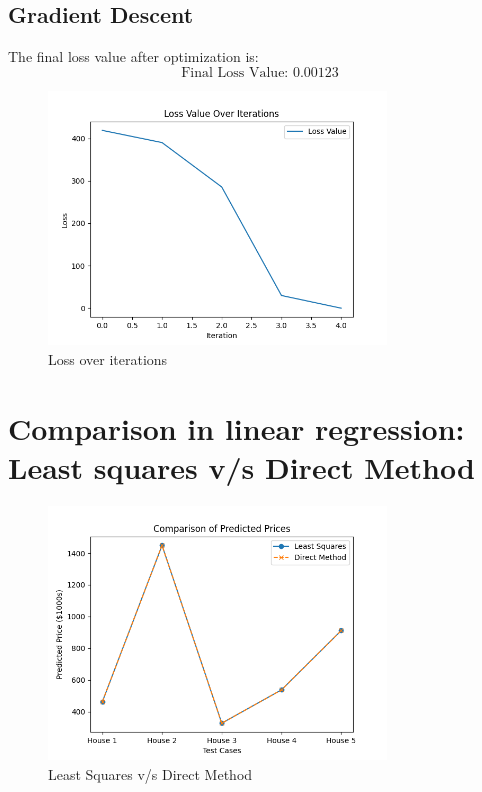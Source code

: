 \documentclass[a4paper,12pt]{article}
\begin{document}
\subsection{Gradient Descent}
    
The final loss value after optimization is:
\[
\boxed{\text{Final Loss Value: } 0.00123}
\]
\begin{figure}[H]
    \centering
    \includegraphics[width=0.8\textwidth]{results/loss_plot.png}
    \caption{Loss over iterations}
    \label{fig:pca}
    \end{figure}

\section{Comparison in linear regression: Least squares v/s Direct Method}
\begin{figure}[H]
    \centering
    \includegraphics[width=0.8\textwidth]{results/linear_regression_comparison_plot.png}
    \caption{Least Squares v/s Direct Method}
    \label{fig:pca}
    \end{figure}
\end{document}
